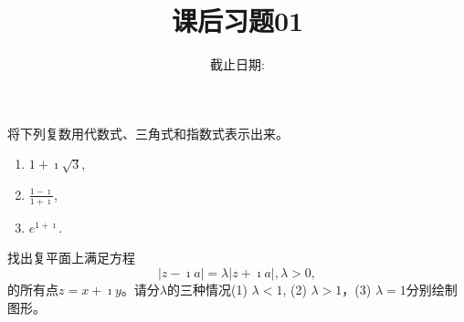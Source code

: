 \documentclass[10pt]{article}
\newenvironment{problem}[2][]{\begin{trivlist}
\item[\hskip \labelsep {\bfseries #1}\hskip \labelsep {\bfseries #2.}]}{\end{trivlist}}
\begin{document}
 



\title{课后习题01}
\author{截止日期: }
\date{}
\maketitle
 

\begin{problem}{1.1}
将下列复数用代数式、三角式和指数式表示出来。
\begin{enumerate}
  \item $1 + \imath \sqrt{3}$,
  \item $\frac{1-\imath}{1+\imath}$,
  \item $e^{1+\imath}$.
\end{enumerate}
\end{problem}


\begin{problem}{1.2}
  找出复平面上满足方程\[|z - \imath a|  = \lambda | z + \imath a|, \lambda > 0,\]
  的所有点$z = x + \imath y$。请分$\lambda$的三种情况(1) $\lambda<1$, (2) $\lambda >1$，(3) $\lambda = 1$分别绘制图形。
\end{problem}

\end{document}
